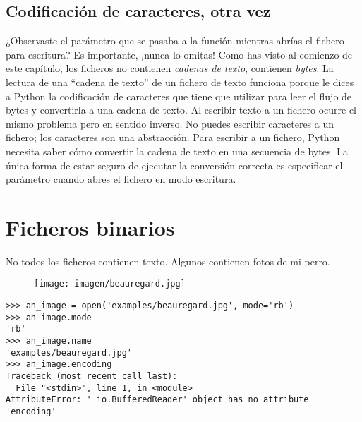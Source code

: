 \subsection{Codificación de caracteres, otra vez}

¿Observaste el parámetro  que se pasaba a la función  mientras abrías el fichero para escritura? Es importante, ¡nunca lo omitas! Como has visto al comienzo de este capítulo, los ficheros no contienen \emph{cadenas de texto}, contienen \emph{bytes}. La lectura de una ``cadena de texto'' de un fichero de texto funciona porque le dices a Python la codificación de caracteres que tiene que utilizar para leer el flujo de bytes y convertirla a una cadena de texto. Al escribir texto a un fichero ocurre el mismo problema pero en sentido inverso. No puedes escribir caracteres a un fichero; los caracteres son una abstracción. Para escribir a un fichero, Python necesita saber cómo convertir la cadena de texto en una secuencia de bytes. La única forma de estar seguro de ejecutar la conversión correcta es especificar el parámetro  cuando abres el fichero en modo escritura.

\section{Ficheros binarios}

No todos los ficheros contienen texto. Algunos contienen fotos de mi perro.
\begin{figure}[htp]
  \centering
  \texttt{[image: imagen/beauregard.jpg]}
\end{figure}

\noindent\begin{minipage}{\textwidth}
\begin{lstlisting}[mathescape=True]
>>> an_image = open('examples/beauregard.jpg', mode='rb')
>>> an_image.mode
'rb'
>>> an_image.name
'examples/beauregard.jpg'
>>> an_image.encoding
Traceback (most recent call last):
  File "<stdin>", line 1, in <module>
AttributeError: '_io.BufferedReader' object has no attribute 'encoding'
\end{lstlisting}
\end{minipage}

